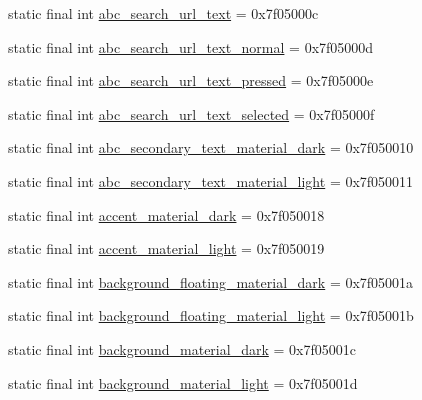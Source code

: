 \begin{DoxyCompactItemize}
\item 
static final int \mbox{\hyperlink{classcom_1_1google_1_1android_1_1gms_1_1R_1_1color_aff6fd1b38313d12c56339da13592594c}{abc\+\_\+search\+\_\+url\+\_\+text}} = 0x7f05000c
\item 
static final int \mbox{\hyperlink{classcom_1_1google_1_1android_1_1gms_1_1R_1_1color_a59ed08fbffe7ad3a2517a0348f2e2476}{abc\+\_\+search\+\_\+url\+\_\+text\+\_\+normal}} = 0x7f05000d
\item 
static final int \mbox{\hyperlink{classcom_1_1google_1_1android_1_1gms_1_1R_1_1color_a1aa012ba5474010aac6c044f93d82cc9}{abc\+\_\+search\+\_\+url\+\_\+text\+\_\+pressed}} = 0x7f05000e
\item 
static final int \mbox{\hyperlink{classcom_1_1google_1_1android_1_1gms_1_1R_1_1color_aae5185581b12030e4cb1f0db40c24e27}{abc\+\_\+search\+\_\+url\+\_\+text\+\_\+selected}} = 0x7f05000f
\item 
static final int \mbox{\hyperlink{classcom_1_1google_1_1android_1_1gms_1_1R_1_1color_ab654dc29ed4d6bd002bb2134e0084ecf}{abc\+\_\+secondary\+\_\+text\+\_\+material\+\_\+dark}} = 0x7f050010
\item 
static final int \mbox{\hyperlink{classcom_1_1google_1_1android_1_1gms_1_1R_1_1color_a75f750f526ece1e4e7ae7edf681b0029}{abc\+\_\+secondary\+\_\+text\+\_\+material\+\_\+light}} = 0x7f050011
\item 
static final int \mbox{\hyperlink{classcom_1_1google_1_1android_1_1gms_1_1R_1_1color_a8a71ca8d6d497e3ddffe08094ef1df51}{accent\+\_\+material\+\_\+dark}} = 0x7f050018
\item 
static final int \mbox{\hyperlink{classcom_1_1google_1_1android_1_1gms_1_1R_1_1color_ad2d8c87785eef2274c5591980170d131}{accent\+\_\+material\+\_\+light}} = 0x7f050019
\item 
static final int \mbox{\hyperlink{classcom_1_1google_1_1android_1_1gms_1_1R_1_1color_ad88a0ce6381f7a816f026e4914f550fc}{background\+\_\+floating\+\_\+material\+\_\+dark}} = 0x7f05001a
\item 
static final int \mbox{\hyperlink{classcom_1_1google_1_1android_1_1gms_1_1R_1_1color_aa43164074edcf7891cfe4366aa1d80e1}{background\+\_\+floating\+\_\+material\+\_\+light}} = 0x7f05001b
\item 
static final int \mbox{\hyperlink{classcom_1_1google_1_1android_1_1gms_1_1R_1_1color_aa5c3ff8d79552e42181b54bd5874c9c7}{background\+\_\+material\+\_\+dark}} = 0x7f05001c
\item 
static final int \mbox{\hyperlink{classcom_1_1google_1_1android_1_1gms_1_1R_1_1color_ab12d70fa7a6030443eab79fb0ece09f1}{background\+\_\+material\+\_\+light}} = 0x7f05001d

\end{DoxyCompactItemize}
